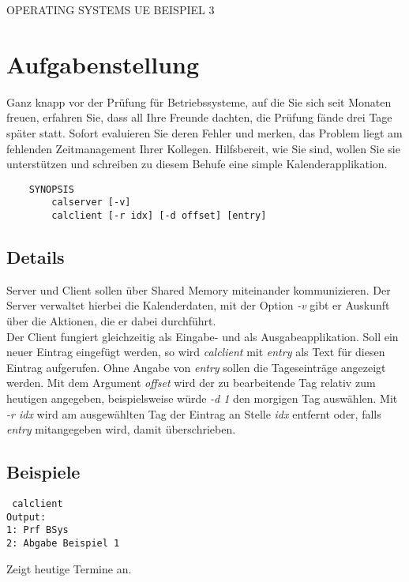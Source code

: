 \documentclass{article}
\begin{document}
\begin{center}
\LARGE OPERATING SYSTEMS UE BEISPIEL 3
\end{center}

\section*{Aufgabenstellung}

Ganz knapp vor der Prüfung für Betriebssysteme, auf die Sie sich seit 
Monaten freuen, erfahren Sie, dass all Ihre Freunde dachten, die Prüfung fände 
drei Tage später statt. Sofort evaluieren Sie deren Fehler und merken, das Problem
liegt am fehlenden Zeitmanagement Ihrer Kollegen. Hilfsbereit, wie Sie sind, wollen 
Sie sie unterstützen und schreiben zu diesem Behufe eine simple Kalenderapplikation.

\begin{verbatim}
    SYNOPSIS
        calserver [-v]
        calclient [-r idx] [-d offset] [entry]
\end{verbatim}

\subsection*{Details}

Server und Client sollen über Shared Memory miteinander 
kommunizieren. Der Server verwaltet hierbei die Kalenderdaten, 
mit der Option \emph{-v} gibt er Auskunft über die Aktionen, 
die er dabei durchführt.\\
Der Client fungiert gleichzeitig als Eingabe- und als Ausgabeapplikation. 
Soll ein neuer Eintrag eingefügt werden, so wird \emph{calclient} mit 
\emph{entry} als Text für diesen Eintrag aufgerufen. Ohne Angabe von \emph{entry} 
sollen die Tageseinträge angezeigt werden.
Mit dem Argument \emph{offset} wird der zu bearbeitende Tag relativ zum heutigen
angegeben, beispielsweise würde \emph{-d 1} den morgigen Tag auswählen. Mit 
\emph{-r idx} wird am ausgewählten Tag der Eintrag an Stelle \emph{idx} entfernt 
oder, falls \emph{entry} mitangegeben wird, damit überschrieben.

\subsection*{Beispiele}

\begin{verbatim} calclient 
Output: 
1: Prf BSys
2: Abgabe Beispiel 1
\end{verbatim}
Zeigt heutige Termine an.
\end{document}
